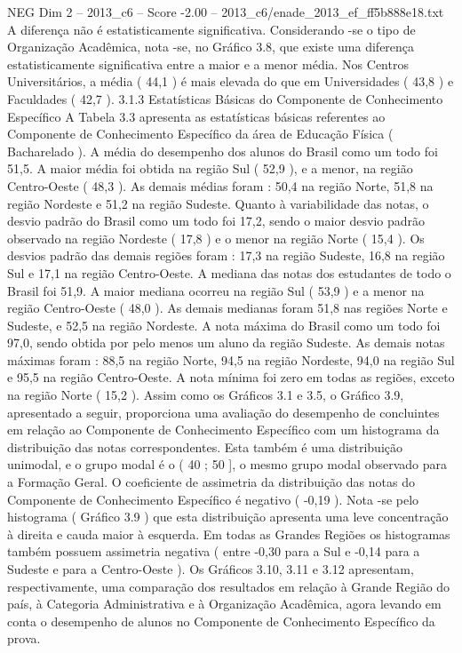 \begin{textsample}{NEG Dim 2 – 2013\_c6 – Score -2.00 – 2013\_c6/enade\_2013\_ef\_ff5b888e18.txt}
A diferença não é estatisticamente significativa.
Considerando -se o tipo de Organização Acadêmica, nota -se, no Gráfico 3.8, que existe uma diferença estatisticamente significativa entre a maior e a menor média.
Nos Centros Universitários, a média ( 44,1 ) é mais elevada do que em Universidades ( 43,8 ) e Faculdades ( 42,7 ). 3.1.3 Estatísticas Básicas do Componente de Conhecimento Específico A Tabela 3.3 apresenta as estatísticas básicas referentes ao Componente de Conhecimento Específico da área de Educação Física ( Bacharelado ).
A média do desempenho dos alunos do Brasil como um todo foi 51,5.
A maior média foi obtida na região Sul ( 52,9 ), e a menor, na região Centro-Oeste ( 48,3 ).
As demais médias foram : 50,4 na região Norte, 51,8 na região Nordeste e 51,2 na região Sudeste.
Quanto à variabilidade das notas, o desvio padrão do Brasil como um todo foi 17,2, sendo o maior desvio padrão observado na região Nordeste ( 17,8 ) e o menor na região Norte ( 15,4 ).
Os desvios padrão das demais regiões foram : 17,3 na região Sudeste, 16,8 na região Sul e 17,1 na região Centro-Oeste.
A mediana das notas dos estudantes de todo o Brasil foi 51,9.
A maior mediana ocorreu na região Sul ( 53,9 ) e a menor na região Centro-Oeste ( 48,0 ).
As demais medianas foram 51,8 nas regiões Norte e Sudeste, e 52,5 na região Nordeste.
A nota máxima do Brasil como um todo foi 97,0, sendo obtida por pelo menos um aluno da região Sudeste.
As demais notas máximas foram : 88,5 na região Norte, 94,5 na região Nordeste, 94,0 na região Sul e 95,5 na região Centro-Oeste.
A nota mínima foi zero em todas as regiões, exceto na região Norte ( 15,2 ).
Assim como os Gráficos 3.1 e 3.5, o Gráfico 3.9, apresentado a seguir, proporciona uma avaliação do desempenho de concluintes em relação ao Componente de Conhecimento Específico com um histograma da distribuição das notas correspondentes.
Esta também é uma distribuição unimodal, e o grupo modal é o ( 40 ; 50 ], o mesmo grupo modal observado para a Formação Geral.
O coeficiente de assimetria da distribuição das notas do Componente de Conhecimento Específico é negativo ( -0,19 ).
Nota -se pelo histograma ( Gráfico 3.9 ) que esta distribuição apresenta uma leve concentração à direita e cauda maior à esquerda.
Em todas as Grandes Regiões os histogramas também possuem assimetria negativa ( entre -0,30 para a Sul e -0,14 para a Sudeste e para a Centro-Oeste ).
Os Gráficos 3.10, 3.11 e 3.12 apresentam, respectivamente, uma comparação dos resultados em relação à Grande Região do país, à Categoria Administrativa e à Organização Acadêmica, agora levando em conta o desempenho de alunos no Componente de Conhecimento Específico da prova.

\end{textsample}
